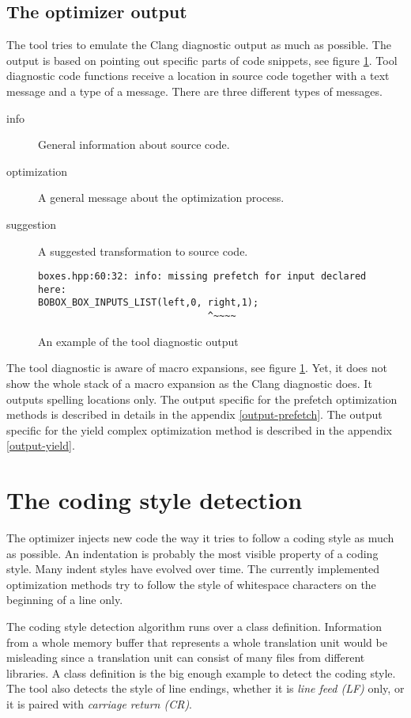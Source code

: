 \subsection{The optimizer output}
The tool tries to emulate the Clang diagnostic output as much as possible. The output is based on pointing out specific parts of code snippets, see figure \ref{modes-output}. Tool diagnostic code functions receive a location in source code together with a text message and a type of a message. There are three different types of messages.

\begin{description}
\item[info]{General information about source code.}
\item[optimization]{A general message about the optimization process.}
\item[suggestion]{A suggested transformation to source code.}
\end{description}

\begin{figure}[h!]
\caption{An example of the tool diagnostic output}
\label{modes-output}
\begin{verbatim}
boxes.hpp:60:32: info: missing prefetch for input declared here:
BOBOX_BOX_INPUTS_LIST(left,0, right,1);
                              ^~~~~
\end{verbatim}
\end{figure}

The tool diagnostic is aware of macro expansions, see figure \ref{modes-output}. Yet, it does not show the whole stack of a macro expansion as the Clang diagnostic does. It outputs spelling locations only. The output specific for the prefetch optimization methods is described in details in the appendix \ref{output-prefetch}. The output specific for the yield complex optimization method is described in the appendix \ref{output-yield}.

\section{The coding style detection}
The optimizer injects new code the way it tries to follow a coding style as much as possible. An indentation is probably the most visible property of a coding style. Many indent styles have evolved over time. The currently implemented optimization methods try to follow the style of whitespace characters on the beginning of a line only.

The coding style detection algorithm runs over a class definition. Information from a whole memory buffer that represents a whole translation unit would be misleading since a translation unit can consist of many files from different libraries. A class definition is the big enough example to detect the coding style. The tool also detects the style of line endings, whether it is \emph{line feed (LF)} only, or it is paired with \emph{carriage return (CR)}.

